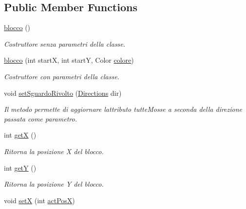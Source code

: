 \subsection*{Public Member Functions}
\begin{DoxyCompactItemize}
\item 
\mbox{\hyperlink{class_snake_1_1game_1_1vipera_1_1blocco_a0143d1efd3c540135c872d58b6b2870d}{blocco}} ()
\begin{DoxyCompactList}\small\item\em Costruttore senza parametri della classe. \end{DoxyCompactList}\item 
\mbox{\hyperlink{class_snake_1_1game_1_1vipera_1_1blocco_a82f454d7ab34406585d65424866b6265}{blocco}} (int startX, int startY, Color \mbox{\hyperlink{class_snake_1_1game_1_1vipera_1_1blocco_ada0bf0be39e4ad9d58f6e7c48f14c64a}{colore}})
\begin{DoxyCompactList}\small\item\em Costruttore con parametri della classe. \end{DoxyCompactList}\item 
void \mbox{\hyperlink{class_snake_1_1game_1_1vipera_1_1blocco_a2d20c8ebc9efc39ed12392e6486d50d9}{set\+Sguardo\+Rivolto}} (\mbox{\hyperlink{enum_snake_1_1game_1_1utility_1_1_directions}{Directions}} dir)
\begin{DoxyCompactList}\small\item\em Il metodo permette di aggiornare l\textquotesingle{}attributo tutte\+Mosse a seconda della direzione passata come parametro. \end{DoxyCompactList}\item 
int \mbox{\hyperlink{class_snake_1_1game_1_1vipera_1_1blocco_ae13f88e922e1339355456062ad9fa359}{getX}} ()
\begin{DoxyCompactList}\small\item\em Ritorna la posizione X del blocco. \end{DoxyCompactList}\item 
int \mbox{\hyperlink{class_snake_1_1game_1_1vipera_1_1blocco_aab81944f0a14bba932c0931899951937}{getY}} ()
\begin{DoxyCompactList}\small\item\em Ritorna la posizione Y del blocco. \end{DoxyCompactList}\item 
void \mbox{\hyperlink{class_snake_1_1game_1_1vipera_1_1blocco_ab5a3acb0391238ee37a5da898bffd5f1}{setX}} (int \mbox{\hyperlink{class_snake_1_1game_1_1vipera_1_1blocco_aaa64105e6cedf2b98a63e3ab8c8f4cdb}{act\+PosX}})

\end{DoxyCompactItemize}
